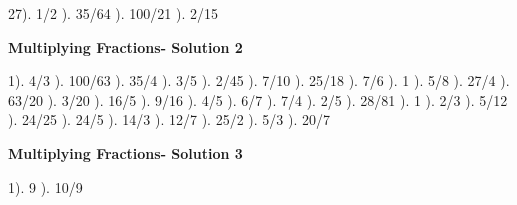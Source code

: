 \documentclass{article}%
\begin{document}
27). 1/2%
). 35/64%
). 100/21%
). 2/15%
\newline%
\newpage%
\large%
\begin{center}%
\textbf{Multiplying Fractions- Solution 2}%
\newline%
\end{center} \normalsize%
1). 4/3%
). 100/63%
). 35/4%
). 3/5%
). 2/45%
). 7/10%
). 25/18%
). 7/6%
). 1%
). 5/8%
). 27/4%
). 63/20%
). 3/20%
). 16/5%
). 9/16%
). 4/5%
). 6/7%
). 7/4%
). 2/5%
). 28/81%
). 1%
). 2/3%
). 5/12%
). 24/25%
). 24/5%
). 14/3%
). 12/7%
). 25/2%
). 5/3%
). 20/7%
\newline%
\newpage%
\large%
\begin{center}%
\textbf{Multiplying Fractions- Solution 3}%
\newline%
\end{center} \normalsize%
1). 9%
). 10/9%
\newline%
\end{document}
